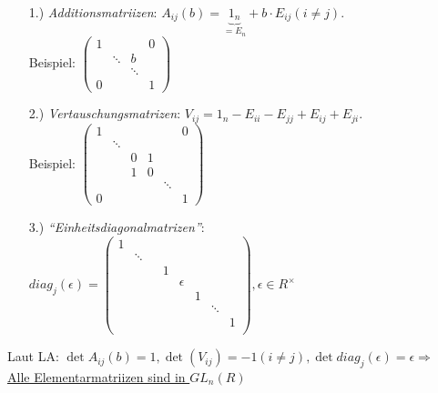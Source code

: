 \documentclass[a4paper,DIV15,BCOR12mm]{article}
\begin{document}
\begin{itemize}
    \item[1.)] \emph{Additionsmatriizen}: $A_{ij}(b) = \underbrace{1_n}_{= E_n} + b\cdot E_{ij} (i \not= j)$.\\
        Beispiel: $\begin{pmatrix}1 & & & 0\\
                                  & \ddots & b \\
                                  & & \ddots & \\
                                0 & & & 1\end{pmatrix}$\\
  \item[2.)] \emph{Vertauschungsmatrizen}: $V_{ij} = 1_n - E_{ii} - E_{jj} + E_{ij} + E_{ji}$.\\
    Beispiel: $\begin{pmatrix}1 & & & & & 0 \\
                                  & \ddots & & & & \\
                                  & & 0 & 1 & & \\
                                  & & 1 & 0 & & \\
                                  & & & & \ddots & \\
                                0 & & & & & 1\end{pmatrix}$\\
  \item[3.)] \emph{"`Einheitsdiagonalmatrizen"'}: \\
    $diag_j(\epsilon) = \begin{pmatrix}1 & & & & & & \\
                                                                             & \ddots & & & & & & \\
                                                                             & & & 1 & & & & \\
                                                                             & & & & \epsilon & & \\
                                                                             & & & & & 1 & & \\
                                                                             & & & & & & \ddots & \\
                                                                             & & & & & & & 1\\\end{pmatrix}, \epsilon \in R^\times$
\end{itemize}
Laut LA: $\det A_{ij}(b) =1, \det(V_{ij}) = -1 (i \not= j), \det diag_j(\epsilon) = \epsilon \Rightarrow$ \\
\underline{Alle Elementarmatriizen sind in $GL_n(R)$}
\end{document}
